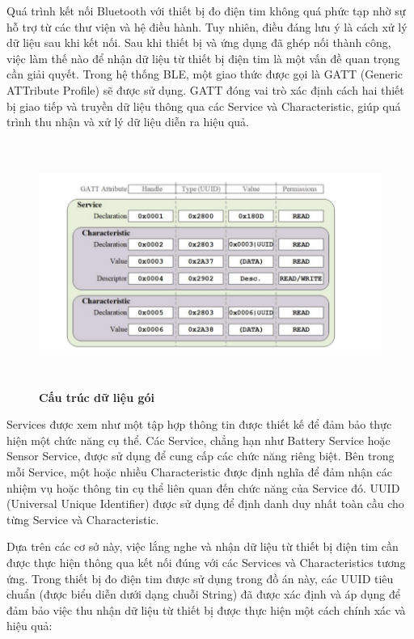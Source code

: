 Quá trình kết nối Bluetooth với thiết bị đo điện tim không quá phức tạp nhờ sự hỗ trợ từ các thư viện và hệ điều hành. Tuy nhiên, điều đáng lưu ý là cách xử lý dữ liệu sau khi kết nối. Sau khi thiết bị và ứng dụng đã ghép nối thành công, việc làm thế nào để nhận dữ liệu từ thiết bị điện tim là một vấn đề quan trọng cần giải quyết. Trong hệ thống BLE, một giao thức được gọi là GATT (Generic ATTribute Profile) sẽ được sử dụng. GATT đóng vai trò xác định cách hai thiết bị giao tiếp và truyền dữ liệu thông qua các Service và Characteristic, giúp quá trình thu nhận và xử lý dữ liệu diễn ra hiệu quả.
\begin{figure}[H]
  \centering
  \includegraphics[width=16cm,height=8cm]{Images/System/fmECG_BLE_system.png}
  \caption[Cấu trúc dữ liệu gói]{\bfseries \fontsize{12pt}{0pt}\selectfont Cấu trúc dữ liệu gói}
  \label{fmECG_BLE_system} %
\end{figure}
Services được xem như một tập hợp thông tin được thiết kế để đảm bảo thực hiện một chức năng cụ thể. Các Service, chẳng hạn như Battery Service hoặc Sensor Service, được sử dụng để cung cấp các chức năng riêng biệt. Bên trong mỗi Service, một hoặc nhiều Characteristic được định nghĩa để đảm nhận các nhiệm vụ hoặc thông tin cụ thể liên quan đến chức năng của Service đó. UUID (Universal Unique Identifier) được sử dụng để định danh duy nhất toàn cầu cho từng Service và Characteristic.

Dựa trên các cơ sở này, việc lắng nghe và nhận dữ liệu từ thiết bị điện tim cần được thực hiện thông qua kết nối đúng với các Services và Characteristics tương ứng. Trong thiết bị đo điện tim được sử dụng trong đồ án này, các UUID tiêu chuẩn (được biểu diễn dưới dạng chuỗi String) đã được xác định và áp dụng để đảm bảo việc thu nhận dữ liệu từ thiết bị được thực hiện một cách chính xác và hiệu quả:

